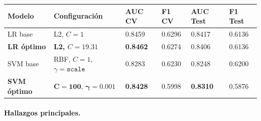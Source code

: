 \documentclass[spanish]{article}
\begin{document}
\begin{center}
\begin{tabular}{llllll}
\toprule
\textbf{Modelo} & \textbf{Configuración} & \textbf{AUC CV} & \textbf{F1 CV} & \textbf{AUC Test} & \textbf{F1 Test} \\
\midrule
LR base           & L2, $C=1$                           & 0.8459 & 0.6296 & 0.8417 & 0.6136 \\
\textbf{LR óptimo}  & \textbf{L2, $C=19.31$}              & \textbf{0.8462} & 0.6274 & 0.8406 & 0.6136 \\
SVM base          & RBF, $C=1$, $\gamma=\texttt{scale}$ & 0.8283 & 0.6230 & 0.8248 & 0.6200 \\
\textbf{SVM óptimo} & $\mathbf{C=100}$, $\boldsymbol{\gamma=0.001}$ & \textbf{0.8428} & 0.5998 & \textbf{0.8310} & 0.5876 \\
\bottomrule
\end{tabular}
\end{center}

\paragraph{Hallazgos principales.}
\end{document}
